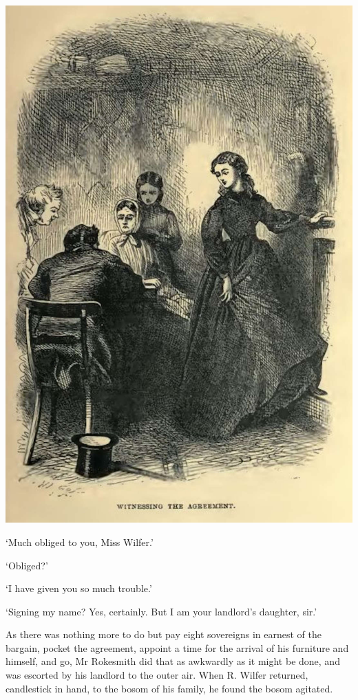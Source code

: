 \includegraphics[scale=2.3]{01-04-01}

‘Much obliged to you, Miss Wilfer.’

‘Obliged?’

‘I have given you so much trouble.’

‘Signing my name? Yes, certainly. But I am your landlord’s daughter,
sir.’

As there was nothing more to do but pay eight sovereigns in earnest of
the bargain, pocket the agreement, appoint a time for the arrival of his
furniture and himself, and go, Mr Rokesmith did that as awkwardly as it
might be done, and was escorted by his landlord to the outer air. When
R. Wilfer returned, candlestick in hand, to the bosom of his family, he
found the bosom agitated.

